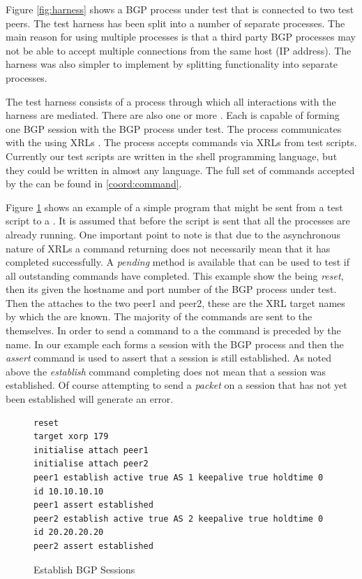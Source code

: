 \documentclass[11pt]{article}
\begin{document}
Figure \ref{fig:harness} shows a BGP process under test that is
connected to two test peers. The test harness has been split into a
number of separate processes. The main reason for using multiple
processes is that a third party BGP processes may not be able to
accept multiple connections from the same host (IP address). The
harness was also simpler to implement by splitting functionality into
separate processes.

The test harness consists of a \coordinator process through which
all interactions with the harness are mediated. There are also one or
more \testpeers . Each \testpeer is capable of forming one BGP
session with the BGP process under test. The \coordinator process
communicates with the \testpeers using XRLs \cite{xorp:xrl}. The
\coordinator process accepts commands via XRLs from test
scripts. Currently our test scripts are written in the shell
programming language, but they could be written in almost any
language. The full set of commands accepted by the \coordinator can be
found in \ref{coord:command}.

Figure \ref{prog:simple} shows an example of a simple program that
might be sent from a test script to a \coordinator. It is assumed that
before the script is sent that all the processes are already running.
One important point to note is that due to the asynchronous nature of
XRLs a command returning does not necessarily mean that it has
completed successfully. A {\em pending} method is available that can
be used to test if all outstanding commands have completed. This
example show the \coordinator being {\em reset}, then its given the
hostname and port number of the BGP process under test. Then the
\coordinator attaches to the two
\testpeers peer1 and peer2, these are the XRL target names by which the
\testpeers are known. The majority of the commands are sent to the
\testpeers themselves. In order to send a command to a \testpeer the
command is preceded by the \testpeer name. In our example each
\testpeer forms a session with the BGP process and then the
{\em assert} command is used to assert that a session is still
established. As noted above the {\em establish} command completing
does not mean that a session was established. Of course attempting to
send a {\em packet} on a session that has not yet been established
will generate an error.

\begin{figure}[htbp]
\small
\begin{verbatim}
reset
target xorp 179
initialise attach peer1
initialise attach peer2
peer1 establish active true AS 1 keepalive true holdtime 0 id 10.10.10.10
peer1 assert established
peer2 establish active true AS 2 keepalive true holdtime 0 id 20.20.20.20
peer2 assert established
\end{verbatim}
\caption{\label{prog:simple}Establish BGP Sessions}
\end{figure}
\end{document}
